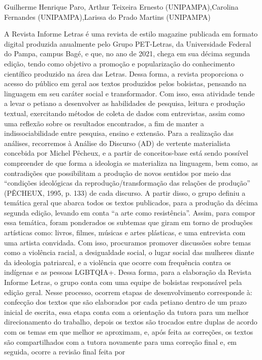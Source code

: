 Guilherme Henrique Paro, Arthur Teixeira Ernesto (UNIPAMPA),Carolina Fernandes (UNIPAMPA),Larissa do Prado Martins (UNIPAMPA)

A Revista Informe Letras é uma revista de estilo magazine publicada em formato digital
produzida anualmente pelo Grupo PET-Letras, da Universidade Federal do Pampa, campus
Bagé, e que, no ano de 2021, chega em sua décima segunda edição, tendo como objetivo a
promoção e popularização do conhecimento científico produzido na área das Letras. Dessa
forma, a revista proporciona o acesso do público em geral aos textos produzidos pelos bolsistas,
pensando na linguagem em seu caráter social e transformador. Com isso, essa atividade tende a
levar o petiano a desenvolver as habilidades de pesquisa, leitura e produção textual, exercitando
métodos de coleta de dados com entrevistas, assim como uma reflexão sobre os resultados
encontrados, a fim de manter a indissociabilidade entre pesquisa, ensino e extensão. Para a
realização das análises, recorremos à Análise do Discurso (AD) de vertente materialista
concebida por Michel Pêcheux, e a partir de conceitos-base está sendo possível compreender de
que forma a ideologia se materializa na linguagem, bem como, as contradições que possibilitam
a produção de novos sentidos por meio das “condições ideológicas da reprodução/transformação
das relações de produção” (PÊCHEUX, 1995, p. 133) de cada discurso. A partir disso, o grupo
definiu a temática geral que abarca todos os textos publicados, para a produção da décima
segunda edição, levando em conta “a arte como resistência”. Assim, para compor essa temática,
foram ponderados os subtemas que giram em torno de produções artísticas como: livros, filmes,
músicas e artes plásticas, e uma entrevista com uma artista convidada. Com isso, procuramos
promover discussões sobre temas como a violência racial, a desigualdade social, o lugar social
das mulheres diante da ideologia patriarcal, e a violência que ocorre com frequência contra os
indígenas e as pessoas LGBTQIA+. Dessa forma, para a elaboração da Revista Informe Letras, o
grupo conta com uma equipe de bolsistas responsável pela edição geral. Nesse processo, ocorrem
etapas de desenvolvimento corresponde à: confecção dos textos que são elaborados por cada
petiano dentro de um prazo inicial de escrita, essa etapa conta com a orientação da tutora para
um melhor direcionamento do trabalho, depois os textos são trocados entre duplas de acordo com
os temas em que melhor se aproximam, e, após feita as correções, os textos são compartilhados
com a tutora novamente para uma correção final e, em seguida, ocorre a revisão final feita por
